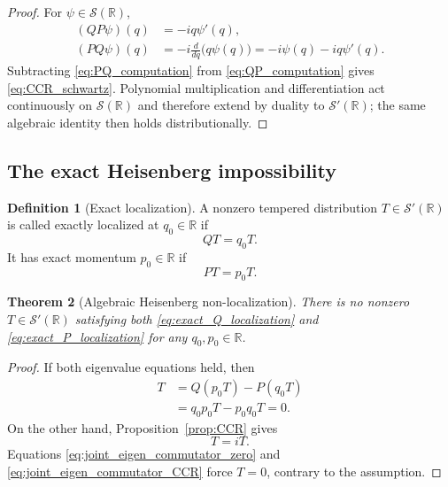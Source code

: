\documentclass[11pt]{amsart}
\numberwithin{equation}{section}
\theoremstyle{plain}
\newtheorem{theorem}{Theorem}[section]
\theoremstyle{definition}
\newtheorem{definition}[theorem]{Definition}
\theoremstyle{remark}
\newcommand{\R}{\mathbb{R}}
\newcommand{\Sch}{\mathcal{S}}
\begin{document}
\begin{proof}
For $\psi\in\Sch(\R)$,
\begin{align}
(QP\psi)(q)
&=-iq\psi'(q),
\label{eq:QP_computation}\\
(PQ\psi)(q)
&=-i\frac{d}{dq}\bigl(q\psi(q)\bigr)
=-i\psi(q)-iq\psi'(q).
\label{eq:PQ_computation}
\end{align}
Subtracting \eqref{eq:PQ_computation} from \eqref{eq:QP_computation} gives
\eqref{eq:CCR_schwartz}.  Polynomial multiplication and differentiation act
continuously on $\Sch(\R)$ and therefore extend by duality to
$\Sch'(\R)$; the same algebraic identity then holds distributionally.
\end{proof}

\subsection{The exact Heisenberg impossibility}
\label{subsec:exact_heisenberg_impossibility}

\begin{definition}[Exact localization]
\label{def:exact_localization}
A nonzero tempered distribution $T\in\Sch'(\R)$ is called exactly localized
at $q_0\in\R$ if
\begin{equation}
QT=q_0T.
\label{eq:exact_Q_localization}
\end{equation}
It has exact momentum $p_0\in\R$ if
\begin{equation}
PT=p_0T.
\label{eq:exact_P_localization}
\end{equation}
\end{definition}

\begin{theorem}[Algebraic Heisenberg non-localization]
\label{thm:no_joint_exact_localization}
There is no nonzero $T\in\Sch'(\R)$ satisfying both
\eqref{eq:exact_Q_localization} and \eqref{eq:exact_P_localization} for any
$q_0,p_0\in\R$.
\end{theorem}

\begin{proof}
If both eigenvalue equations held, then
\begin{align}
[Q,P]T
&=Q(p_0T)-P(q_0T)
\label{eq:joint_eigen_commutator_first}\\
&=q_0p_0T-p_0q_0T
=0.
\label{eq:joint_eigen_commutator_zero}
\end{align}
On the other hand, Proposition~\ref{prop:CCR} gives
\begin{equation}
[Q,P]T=iT.
\label{eq:joint_eigen_commutator_CCR}
\end{equation}
Equations \eqref{eq:joint_eigen_commutator_zero} and
\eqref{eq:joint_eigen_commutator_CCR} force $T=0$, contrary to the
assumption.
\end{proof}
\end{document}
